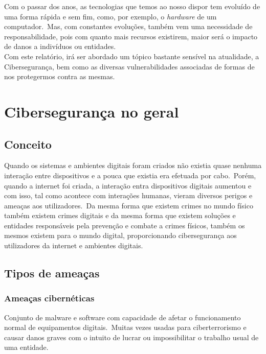 \documentclass{report}
\begin{document}
Com o passar dos anos, as tecnologias que temos ao nosso dispor tem evoluído de uma forma rápida e sem fim, como, por exemplo, o \textit{hardware} de um computador.\ Mas, com constantes evoluções, também vem uma necessidade de responsabilidade, pois com quanto mais recursos existirem, maior será o impacto de danos a indivíduos ou entidades.\\

Com este relatório, irá ser abordado um tópico bastante sensível na atualidade, a Cibersegurança, bem como as diversas vulnerabilidades associadas de formas de nos protegermos contra as mesmas.

\chapter{Cibersegurança no geral}
\label{ch:ciberseguranca-no-geral}
\section{Conceito}
Quando os sistemas e ambientes digitais foram criados não existia quase nenhuma interação entre dispositivos e a pouca que existia era efetuada por cabo.\ Porém, quando a internet foi criada, a interação entra dispositivos digitais aumentou e com isso, tal como acontece com interações humanas, vieram diversos perigos e ameaças aos utilizadores.\ Da mesma forma que existem crimes no mundo físico também existem crimes digitais e da mesma forma que existem soluções e entidades responsáveis pela prevenção e combate a crimes físicos, também os mesmos existem para o mundo digital, proporcionando cibersegurança aos utilizadores da internet e ambientes digitais.

\section{Tipos de ameaças}
\subsection{Ameaças cibernéticas}
Conjunto de malware e software com capacidade de afetar o funcionamento normal de equipamentos digitais.\ Muitas vezes usadas para ciberterrorismo e causar danos graves com o intuito de lucrar ou impossibilitar o trabalho usual de uma entidade.\\
\end{document}
